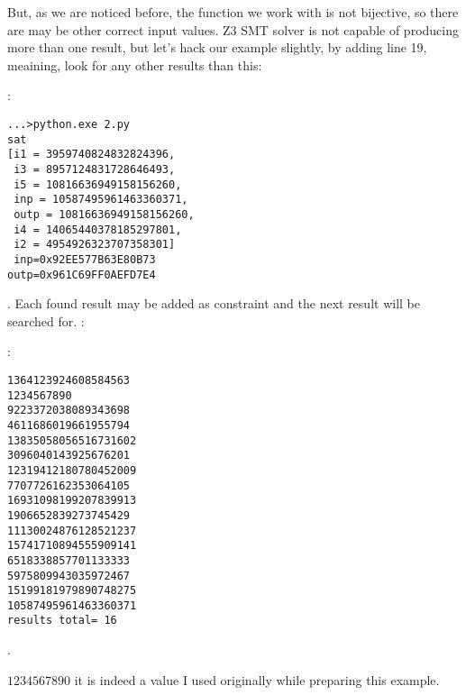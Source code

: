 {But, as we are noticed before, the function we work with is not bijective, so there are may be other correct
input values}.
{Z3 SMT solver is not capable of producing more than one result, but let's hack our example slightly, 
by adding line 19, meaining, look for any other results than this}:



:

\begin{lstlisting}
...>python.exe 2.py
sat
[i1 = 3959740824832824396,
 i3 = 8957124831728646493,
 i5 = 10816636949158156260,
 inp = 10587495961463360371,
 outp = 10816636949158156260,
 i4 = 14065440378185297801,
 i2 = 4954926323707358301]
 inp=0x92EE577B63E80B73
outp=0x961C69FF0AEFD7E4
\end{lstlisting}

.
{Each found result may be added as constraint and the next result will be searched for}.
:



:

\begin{lstlisting}
1364123924608584563
1234567890
9223372038089343698
4611686019661955794
13835058056516731602
3096040143925676201
12319412180780452009
7707726162353064105
16931098199207839913
1906652839273745429
11130024876128521237
15741710894555909141
6518338857701133333
5975809943035972467
15199181979890748275
10587495961463360371
results total= 16
\end{lstlisting}

 .

 $1234567890$\EMDASH{}
{it is indeed a value I used originally while preparing this example}.

